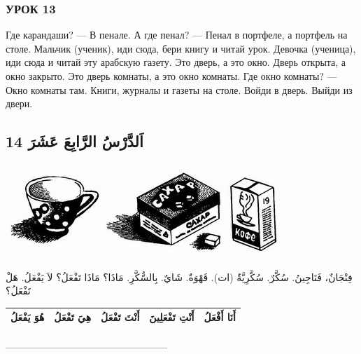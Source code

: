 \documentclass[a5paper]{article}
\begin{document}
\subsubsection{УРОК 13}
Где карандаши? — В пенале. А где пенал? — Пенал в портфеле, а портфель на столе. Мальчик (ученик), иди сюда, бери книгу и читай урок. Девочка (ученица), иди сюда и читай эту арабскую газету. Это дверь, а это окно. Дверь открыта, а окно закрыто. Это дверь комнаты, а это окно комнаты. Где окно комнаты? — Окно комнаты там. Книги, журналы и газеты на столе. Войди в дверь. Выйди из двери.

\subsection{14 اَلدَّرْسُ الرَّابِعَ عَشَرَ}
\  \includegraphics[width=1.3437in,height=1.3854in]{MuhammadBagauddinlatinized-img026.jpg}   \includegraphics[width=1.7811in,height=1.3854in]{MuhammadBagauddinlatinized-img027.jpg}   \includegraphics[width=0.802in,height=1.3543in]{MuhammadBagauddinlatinized-img028.jpg} 

فِنْجَانٌ، فَنَاجِينُ. سُكَّرٌ. سُكَّرِيَّةٌ (ات). قَهْوَةٌ. شَايٌ. بِالسُّكَّرِ. مَاذَا؟ مَاذَا تَفْعَلُ؟ لاَ يَفْعَلُ. هَلْ تَفْعَلُ؟

\begin{flushleft}
\tablefirsthead{}
\tablehead{}
\tabletail{}
\tablelasttail{}
\begin{supertabular}{|m{1.1712599in}|m{1.2962599in}|m{1.2962599in}|m{1.4212599in}|m{1.0670599in}|}
\hline
هُوَ يَفْعَلُ &
هِيَ تَفْعَلُ &
أَنْتَ تَفْعَلُ &
أَنْتِ تَفْعَلِينَ &
أَنَا أَفْعَلُ\\\hline
\end{supertabular}
\end{flushleft}
\_\_\_\_\_\_\_\_\_\_\_\_\_\_\_\_\_\_\_\_\_\_
\end{document}
